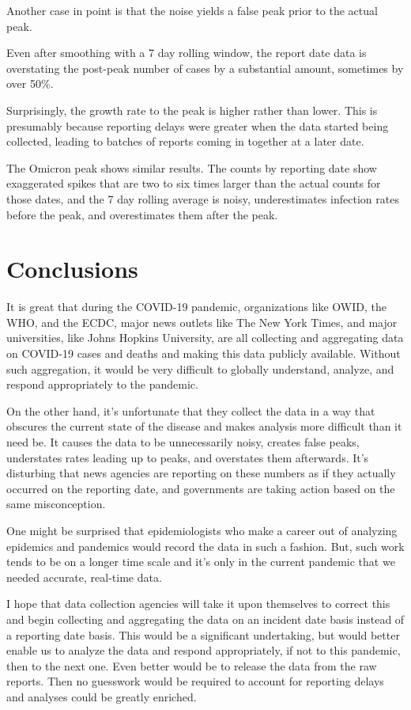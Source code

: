 \documentclass[10pt,reqno]{amsart}
\begin{document}
Another case in point is that the noise yields a false peak prior to
the actual peak.

Even after smoothing with a 7 day rolling window, the report date
data is overstating the post-peak number of cases by a substantial
amount, sometimes by over 50\%.

Surprisingly, the growth rate to the peak is higher rather than lower.
This is presumably because reporting delays were greater when the data
started being collected, leading to batches of reports coming in
together at a later date.

The Omicron peak shows similar results.  The counts by reporting date
show exaggerated spikes that are two to six times larger than the
actual counts for those dates, and the 7 day rolling average is noisy,
underestimates infection rates before the peak, and overestimates them
after the peak.

\section{Conclusions}
It is great that during the COVID-19 pandemic, organizations like OWID, the
WHO, and the ECDC, major news outlets like The New York Times, and
major universities, like Johns Hopkins University, are all collecting
and aggregating data on COVID-19 cases and deaths and making this data
publicly available.  Without such aggregation, it would be very
difficult to globally understand, analyze, and respond appropriately
to the pandemic.

On the other hand, it's unfortunate that they collect the data in a
way that obscures the current state of the disease and makes analysis
more difficult than it need be.  It causes the data to be
unnecessarily noisy, creates false peaks, understates rates leading up
to peaks, and overstates them afterwards.  It's disturbing that news
agencies are reporting on these numbers as if they actually occurred
on the reporting date, and governments are taking action based on
the same misconception.

One might be surprised that epidemiologists who make a career out of
analyzing epidemics and pandemics would record the data in such a
fashion.  But, such work tends to be on a longer time scale and it's
only in the current pandemic that we needed accurate, real-time
data.

I hope that data collection agencies will take it upon themselves to
correct this and begin collecting and aggregating the data on an
incident date basis instead of a reporting date basis.  This would be
a significant undertaking, but would better enable us to analyze the
data and respond appropriately, if not to this pandemic, then to the
next one.  Even better would be to release the data from the raw
reports.  Then no guesswork would be required to account for reporting
delays and analyses could be greatly enriched.

\printbibliography
\end{document}
